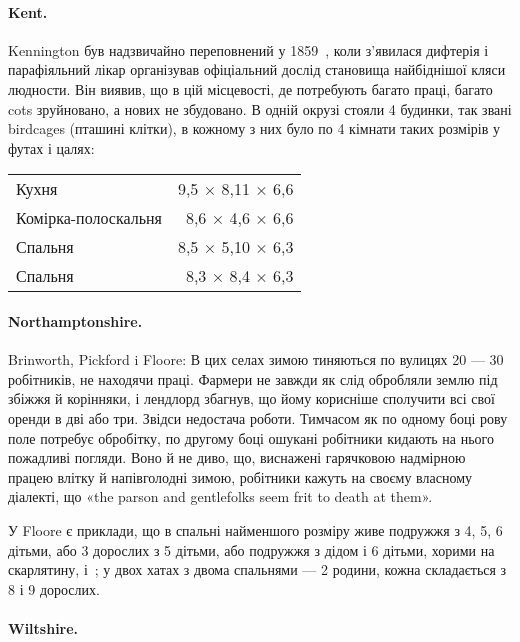 \paragraph{Kent.}

Kennington був надзвичайно переповнений у 1859~, коли
з’явилася дифтерія і парафіяльний лікар організував офіціальний
дослід становища найбіднішої кляси людности. Він виявив, що
в цій місцевості, де потребують багато праці, багато cots зруйновано,
а нових не збудовано. В одній окрузі стояли 4 будинки,
так звані birdcages (пташині клітки), в кожному з них було по
4 кімнати таких розмірів у футах і цалях:

\begin{table}[h]
  \centering
  \begin{tabular}{lr}
    Кухня\dotfill{} & 9,5 × 8,11 × 6,6 \\
    Комірка-полоскальня & 8,6 × 4,6\phantom{0} × 6,6 \\
    Спальня\dotfill{}&8,5 × 5,10 × 6,3 \\
    Спальня\dotfill{}&8,3 × 8,4\phantom{0} × 6,3 \\
  \end{tabular}
\end{table}

\paragraph{Northamptonshire.}
Brinworth, Pickford i Floore: В цих селах зимою тиняються
по вулицях 20 — 30 робітників, не находячи праці. Фармери не
завжди як слід обробляли землю під збіжжя й корінняки, і лендлорд
збагнув, що йому корисніше сполучити всі свої оренди
в дві або три. Звідси недостача роботи. Тимчасом як по одному
боці рову поле потребує обробітку, по другому боці ошукані
робітники кидають на нього пожадливі погляди. Воно й не диво,
що, виснажені гарячковою надмірною працею влітку й напівголодні
зимою, робітники кажуть на своєму власному діалекті,
що «the parson and gentlefolks seem frit to death at them».

У Floore є приклади, що в спальні найменшого розміру живе
подружжя з 4, 5, 6 дітьми, або 3 дорослих з 5 дітьми, або подружжя
з дідом і 6 дітьми, хорими на скарлятину, і~; у двох
хатах з двома спальнями — 2 родини, кожна складається з 8
і 9 дорослих.

\paragraph{Wiltshire.}

